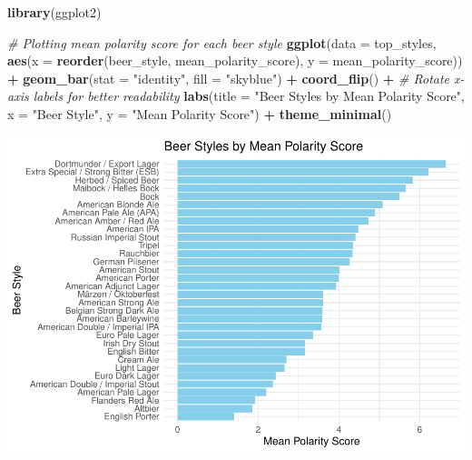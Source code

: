 \documentclass[
  a4paper,
]{article}
\newenvironment{Shaded}{\begin{snugshade}}{\end{snugshade}}
\newcommand{\AttributeTok}[1]{\textcolor[rgb]{0.13,0.29,0.53}{#1}}
\newcommand{\CommentTok}[1]{\textcolor[rgb]{0.56,0.35,0.01}{\textit{#1}}}
\newcommand{\FunctionTok}[1]{\textcolor[rgb]{0.13,0.29,0.53}{\textbf{#1}}}
\newcommand{\NormalTok}[1]{#1}
\newcommand{\SpecialCharTok}[1]{\textcolor[rgb]{0.81,0.36,0.00}{\textbf{#1}}}
\newcommand{\StringTok}[1]{\textcolor[rgb]{0.31,0.60,0.02}{#1}}
\begin{document}
\begin{Shaded}
\begin{Highlighting}[]
\FunctionTok{library}\NormalTok{(ggplot2)}

\CommentTok{\# Plotting mean polarity score for each beer style}
\FunctionTok{ggplot}\NormalTok{(}\AttributeTok{data =}\NormalTok{ top\_styles, }\FunctionTok{aes}\NormalTok{(}\AttributeTok{x =} \FunctionTok{reorder}\NormalTok{(beer\_style, mean\_polarity\_score), }\AttributeTok{y =}\NormalTok{ mean\_polarity\_score)) }\SpecialCharTok{+}
  \FunctionTok{geom\_bar}\NormalTok{(}\AttributeTok{stat =} \StringTok{"identity"}\NormalTok{, }\AttributeTok{fill =} \StringTok{"skyblue"}\NormalTok{) }\SpecialCharTok{+}
  \FunctionTok{coord\_flip}\NormalTok{() }\SpecialCharTok{+}  \CommentTok{\# Rotate x{-}axis labels for better readability}
  \FunctionTok{labs}\NormalTok{(}\AttributeTok{title =} \StringTok{"Beer Styles by Mean Polarity Score"}\NormalTok{,}
       \AttributeTok{x =} \StringTok{"Beer Style"}\NormalTok{,}
       \AttributeTok{y =} \StringTok{"Mean Polarity Score"}\NormalTok{) }\SpecialCharTok{+}
  \FunctionTok{theme\_minimal}\NormalTok{()}
\end{Highlighting}
\end{Shaded}

\includegraphics{finalfrfr_files/figure-latex/unnamed-chunk-22-1.pdf}

\begin{Shaded}
\end{Shaded}
\end{document}

